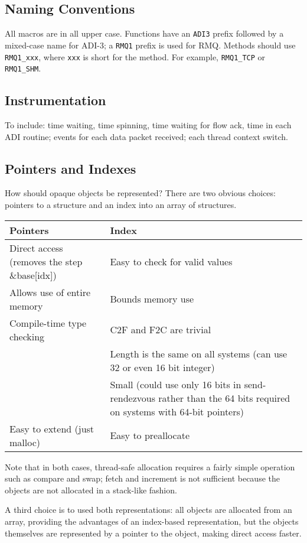 \documentclass{article}
\let\code=\texttt
\begin{document}
\subsection{Naming Conventions}
All macros are in all upper case.  Functions have an \code{ADI3} prefix
followed by a mixed-case name for ADI-3; a \code{RMQ1} prefix is used for RMQ.
Methods should use \code{RMQ1_xxx}, where \code{xxx} is short for the method.
For example, \code{RMQ1_TCP} or \code{RMQ1_SHM}.

\subsection{Instrumentation}
To include: time waiting, time spinning, time waiting for flow ack, time in
each ADI routine; events for each data packet received; each thread context
switch. 

\subsection{Pointers and Indexes}
How should opaque objects be represented?  There are two obvious choices:
pointers to a structure and an index into an array of structures.  

\begin{center}
\begin{tabular}{p{2.5in}p{2.5in}}
Pointers&Index\\\hline
Direct access (removes the step \&base[idx])&Easy to check for valid values\\
Allows use of entire memory&Bounds memory use\\
Compile-time type checking&C2F and F2C are trivial\\
&Length is the same on all systems (can use 32 or even 16 bit integer)\\
&Small (could use only 16 bits in send-rendezvous rather than the 64 bits
required on systems with 64-bit pointers)\\
Easy to extend (just malloc)&Easy to preallocate\\
\end{tabular}
\end{center}
Note that in both cases, thread-safe allocation requires a fairly simple
operation such as compare and swap; fetch and increment is not sufficient
because the objects are not allocated in a stack-like fashion.

A third choice is to used both representations:  all objects are allocated
from an array, providing the advantages of an index-based representation, but
the objects themselves are represented by a pointer to the object, making
direct access faster.



\end{document}

